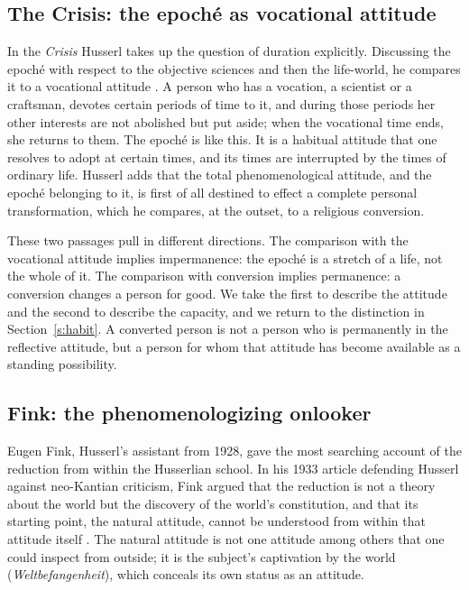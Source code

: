 \documentclass{situationist-preprint}
\begin{document}
\subsection{The Crisis: the epoché as vocational attitude}

In the \emph{Crisis} Husserl takes up the question of duration explicitly. Discussing the epoché with respect to the objective sciences and then the life-world, he compares it to a vocational attitude \citep[§35]{Husserl1954}. A person who has a vocation, a scientist or a craftsman, devotes certain periods of time to it, and during those periods her other interests are not abolished but put aside; when the vocational time ends, she returns to them. The epoché is like this. It is a habitual attitude that one resolves to adopt at certain times, and its times are interrupted by the times of ordinary life. Husserl adds that the total phenomenological attitude, and the epoché belonging to it, is first of all destined to effect a complete personal transformation, which he compares, at the outset, to a religious conversion.

These two passages pull in different directions. The comparison with the vocational attitude implies impermanence: the epoché is a stretch of a life, not the whole of it. The comparison with conversion implies permanence: a conversion changes a person for good. We take the first to describe the attitude and the second to describe the capacity, and we return to the distinction in Section~\ref{s:habit}. A converted person is not a person who is permanently in the reflective attitude, but a person for whom that attitude has become available as a standing possibility.

\subsection{Fink: the phenomenologizing onlooker}

Eugen Fink, Husserl's assistant from 1928, gave the most searching account of the reduction from within the Husserlian school. In his 1933 article defending Husserl against neo-Kantian criticism, Fink argued that the reduction is not a theory about the world but the discovery of the world's constitution, and that its starting point, the natural attitude, cannot be understood from within that attitude itself \citep{Fink1933}. The natural attitude is not one attitude among others that one could inspect from outside; it is the subject's captivation by the world (\emph{Weltbefangenheit}), which conceals its own status as an attitude.
\end{document}
